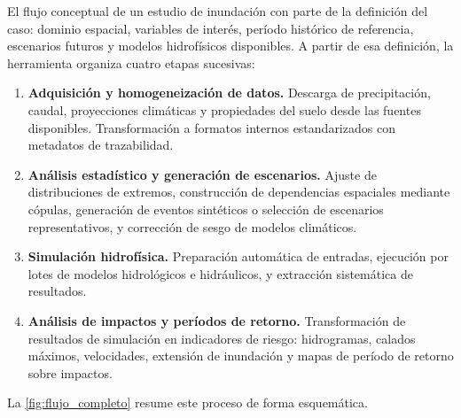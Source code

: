 El flujo conceptual de un estudio de inundación con \hydra parte de la definición del caso: dominio espacial, variables de interés, período histórico de referencia, escenarios futuros y modelos hidrofísicos disponibles. A partir de esa definición, la herramienta organiza cuatro etapas sucesivas:

\begin{enumerate}
  \item \textbf{Adquisición y homogeneización de datos.} Descarga de precipitación, caudal, proyecciones climáticas y propiedades del suelo desde las fuentes disponibles. Transformación a formatos internos estandarizados con metadatos de trazabilidad.

  \item \textbf{Análisis estadístico y generación de escenarios.} Ajuste de distribuciones de extremos, construcción de dependencias espaciales mediante cópulas, generación de eventos sintéticos o selección de escenarios representativos, y corrección de sesgo de modelos climáticos.

  \item \textbf{Simulación hidrofísica.} Preparación automática de entradas, ejecución por lotes de modelos hidrológicos e hidráulicos, y extracción sistemática de resultados.

  \item \textbf{Análisis de impactos y períodos de retorno.} Transformación de resultados de simulación en indicadores de riesgo: hidrogramas, calados máximos, velocidades, extensión de inundación y mapas de período de retorno sobre impactos.
\end{enumerate}

La \cref{fig:flujo_completo} resume este proceso de forma esquemática.


